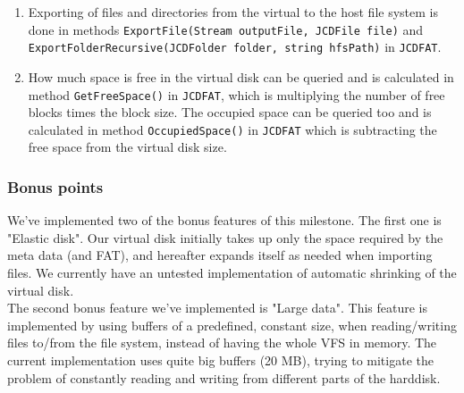 \documentclass[a4paper,12pt]{article}
\begin{document}
\begin{enumerate}
	\item Exporting of files and directories from the virtual to the host file system is done in methods \texttt{ExportFile(Stream outputFile, JCDFile file)} and \texttt{ExportFolderRecursive(JCDFolder folder, string hfsPath)} in \texttt{JCDFAT}.
	\item How much space is free in the virtual disk can be queried and is calculated in method \texttt{GetFreeSpace()} in \texttt{JCDFAT}, which is multiplying the number of free blocks times the block size. The occupied space can be queried too and is calculated in method \texttt{OccupiedSpace()} in \texttt{JCDFAT} which is subtracting the free space from the virtual disk size.
\end{enumerate}

\subsubsection{Bonus points}
We've implemented two of the bonus features of this milestone. The first one is "Elastic disk". Our virtual disk initially takes up only the space required by the meta data (and FAT), and hereafter expands itself as needed when importing files. We currently have an untested implementation of automatic shrinking of the virtual disk.\\
The second bonus feature we've implemented is "Large data". This feature is implemented by using buffers of a predefined, constant size, when reading/writing files to/from the file system, instead of having the whole VFS in memory. The current implementation uses quite big buffers (20 MB), trying to mitigate the problem of constantly reading and writing from different parts of the harddisk.
\end{document}
